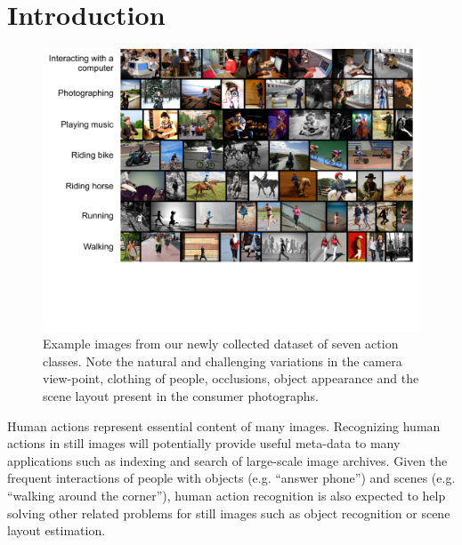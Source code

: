 \documentclass{bmvc2k}
\newcommand{\red}[1]{{\em \small \color{red} #1}} %
\newcommand{\secnspc}{\vspace*{-2mm}}
\newcommand{\capnspc}{\vspace*{-4mm}}
\newcommand{\cfs}{\small}   %
\begin{document}
\secnspc
\section{Introduction}
\secnspc

\label{sec:intro}



\begin{figure}[tbp]
 \small
\includegraphics[width=.95\linewidth]{figs/my_dataset_cropped.pdf}
\capnspc
\caption{\cfs Example images from our newly collected dataset of seven action classes.
Note the natural and challenging variations in the camera view-point, clothing of people, occlusions, object appearance and the scene layout present in the consumer photographs.
 \normalsize
   }
 \label{fig:dataset}
\capnspc
\end{figure}


Human actions represent essential content of many images. Recognizing human actions in still images will potentially provide useful meta-data to many applications such as indexing and search of large-scale image archives. Given the frequent interactions of people with objects (e.g. ``answer phone'') and scenes (e.g. ``walking around the corner''), human action recognition is also expected to help solving other related problems for still images such as object recognition or  scene layout estimation.
\end{document}
